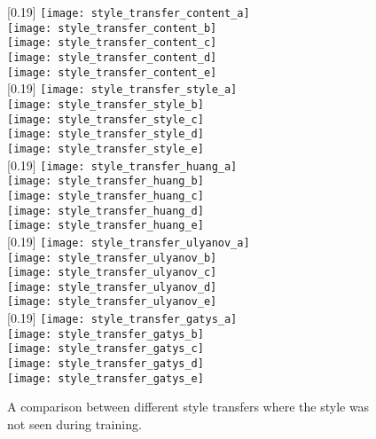 \begin{figure}
	\centering
	[0.19\textwidth]{
		\texttt{[image: style\_transfer\_content\_a]}\\
		\texttt{[image: style\_transfer\_content\_b]}\\
		\texttt{[image: style\_transfer\_content\_c]}\\
		\texttt{[image: style\_transfer\_content\_d]}\\
		\texttt{[image: style\_transfer\_content\_e]}\\
	}
	[0.19\textwidth]{
		\texttt{[image: style\_transfer\_style\_a]}\\
		\texttt{[image: style\_transfer\_style\_b]}\\
		\texttt{[image: style\_transfer\_style\_c]}\\
		\texttt{[image: style\_transfer\_style\_d]}\\
		\texttt{[image: style\_transfer\_style\_e]}\\
	}
	[0.19\textwidth]{
		\texttt{[image: style\_transfer\_huang\_a]}\\
		\texttt{[image: style\_transfer\_huang\_b]}\\
		\texttt{[image: style\_transfer\_huang\_c]}\\
		\texttt{[image: style\_transfer\_huang\_d]}\\
		\texttt{[image: style\_transfer\_huang\_e]}\\
	}
	[0.19\textwidth]{
		\texttt{[image: style\_transfer\_ulyanov\_a]}\\
		\texttt{[image: style\_transfer\_ulyanov\_b]}\\
		\texttt{[image: style\_transfer\_ulyanov\_c]}\\
		\texttt{[image: style\_transfer\_ulyanov\_d]}\\
		\texttt{[image: style\_transfer\_ulyanov\_e]}\\
	}
	[0.19\textwidth]{
		\texttt{[image: style\_transfer\_gatys\_a]}\\
		\texttt{[image: style\_transfer\_gatys\_b]}\\
		\texttt{[image: style\_transfer\_gatys\_c]}\\
		\texttt{[image: style\_transfer\_gatys\_d]}\\
		\texttt{[image: style\_transfer\_gatys\_e]}\\
	}
	\caption{A comparison between different style transfers where the style was not seen during training.}
	\label{fig:style_transfer_unseen_style}
\end{figure}

